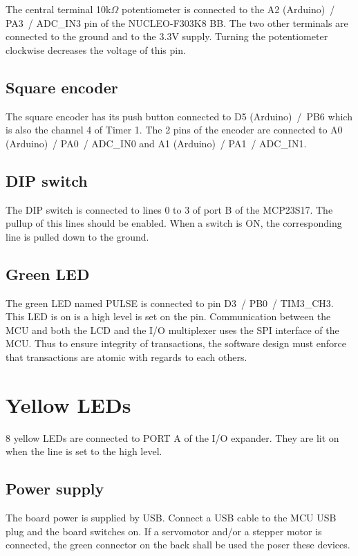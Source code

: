 \documentclass[11pt]{report}
\begin{document}
The central terminal 10k$\Omega$ potentiometer is connected to the A2 (Arduino)~/ PA3~/ ADC\_IN3 pin of the NUCLEO-F303K8 BB. The two other terminals are connected to the ground and to the 3.3V supply. Turning the potentiometer clockwise decreases the voltage of this pin.

\subsection{Square encoder}

The square encoder has its push button connected to D5 (Arduino)~/~PB6 which is also the channel 4 of Timer 1. The 2 pins of the encoder are connected to A0 (Arduino)~/ PA0~/ ADC\_IN0 and A1 (Arduino)~/ PA1~/ ADC\_IN1.

\subsection{DIP switch}

The DIP switch is connected to lines 0 to 3 of port B of the MCP23S17. The pullup of this lines should be enabled. When a switch is ON, the corresponding line is pulled down to the ground.

\subsection{Green LED}

The green LED named PULSE is connected to pin D3~/ PB0~/ TIM3\_CH3. This LED is on is a high level is set on the pin.
Communication between the MCU and both the LCD and the I/O multiplexer uses the SPI interface of the MCU.
Thus to ensure integrity of transactions, the software design must enforce that transactions are atomic with regards to each others.

\section{Yellow LEDs}

8 yellow LEDs are connected to PORT A of the I/O expander. They are lit on when the line is set to the high level. 

\subsection{Power supply}

The board power is supplied by USB. Connect a USB cable to the MCU USB plug and the board switches on. If a servomotor and/or a stepper motor is connected, the green connector on the back shall be used the poser these devices.
\end{document}
